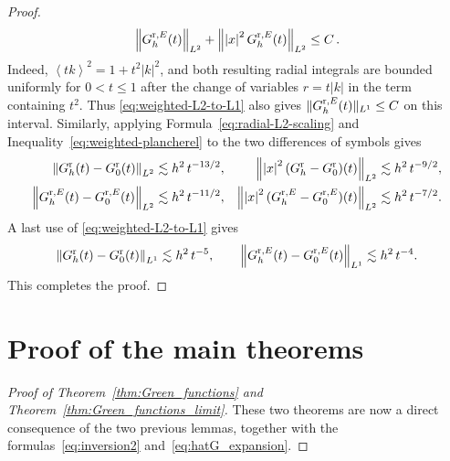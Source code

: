 \documentclass[a4paper,12pt]{amsart} %
\theoremstyle{plain}
\theoremstyle{definition}
\newcommand		{\lt}			{\left}				%
\newcommand		{\rt}			{\right}			%
\renewcommand	{\(}			{\lt(}
\renewcommand	{\)}			{\rt)}
\newcommand		{\bangle}[1]	{\lt\langle #1\rt\rangle}
\newcommand		{\weight}[1]	{\bangle{#1}}	%
\newcommand		{\n}[1]			{\lt\lvert{#1}\rt\rvert}	%
\newcommand		{\nrm}[1]		{\lt\lVert{#1}\rt\rVert}		%
\newcommand		{\snrm}[1]		{\lVert #1\rVert}
\newcommand		{\Nrm}[2]		{\nrm{#1}_{#2}}
\newcommand		{\sNrm}[2]		{\snrm{#1}_{#2}}
\newcommand	{\h}			{h}
\newcommand		{\Gr}			{G^{\textnormal{r}}}
\newcommand		{\GrE}			{G^{\textnormal{r},E}}
\begin{document}
\begin{proof}
		\begin{equation*}
			\Nrm{\GrE_\h(t)}{L^2} + \Nrm{\n{x}^2\GrE_\h(t)}{L^2}\leq C \, .
		\end{equation*}
		Indeed, $\weight{t k}^2 = 1+t^2\n{k}^2$, and both resulting radial integrals are bounded uniformly for $0<t\leq1$ after the change of variables $r=t\n{k}$ in the term containing $t^2$. Thus \eqref{eq:weighted-L2-to-L1} also gives $\sNrm{\GrE_\h(t)}{L^1}\leq C$ on this interval. Similarly, applying Formula~\eqref{eq:radial-L2-scaling} and Inequality~\eqref{eq:weighted-plancherel} to the two differences of symbols gives
		\begin{align*}
			\Nrm{\Gr_\h(t)-\Gr_0(t)}{L^2} &\lesssim \h^2 \, t^{-13/2},
			&\Nrm{\n{x}^2(\Gr_\h-\Gr_0)(t)}{L^2} &\lesssim \h^2 \, t^{-9/2},
			\\
			\Nrm{\GrE_\h(t)-\GrE_0(t)}{L^2} &\lesssim \h^2 \, t^{-11/2},
			&\Nrm{\n{x}^2(\GrE_\h-\GrE_0)(t)}{L^2} &\lesssim \h^2 \, t^{-7/2}.
		\end{align*}
		A last use of \eqref{eq:weighted-L2-to-L1} gives
		\begin{equation*}
			\Nrm{\Gr_\h(t)-\Gr_0(t)}{L^1} \lesssim \h^2 \, t^{-5},
			\qquad
			\Nrm{\GrE_\h(t)-\GrE_0(t)}{L^1} \lesssim \h^2 \, t^{-4}.
		\end{equation*}
		This completes the proof.
	\end{proof}



\section{Proof of the main theorems}





	\begin{proof}[Proof of Theorem~\ref{thm:Green_functions} and Theorem~\ref{thm:Green_functions_limit}]
		These two theorems are now a direct consequence of the two previous lemmas, together with the formulas~\eqref{eq:inversion2} and~\eqref{eq:hatG_expansion}.
	\end{proof}
\end{document}

